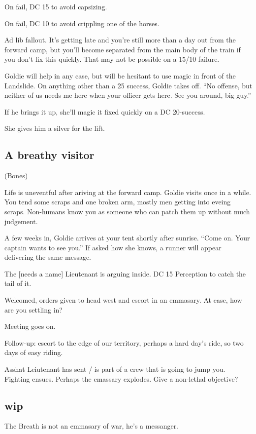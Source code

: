 \begin{multicols}{2}
On fail, DC 15 to avoid capsizing.

On fail, DC 10 to avoid crippling one of the horses.

Ad lib fallout.
It's getting late and you're still more than a day out from the forward camp, but you'll become
  separated from the main body of the train if you don't fix this quickly.
That may not be possible on a 15/10 failure.

Goldie will help in any case, but will be hesitant to use magic in front of the Landslide.
On anything other than a 25 success, Goldie takes off.
``No offense, but neither of us needs me here when your officer gets here.
See you around, big guy.''

If he brings it up, she'll magic it fixed quickly on a DC 20-success.

She gives him a silver for the lift.

\subsection{A breathy visitor}
(Bones)

Life is uneventful after ariving at the forward camp.
Goldie visits once in a while.
You tend some scraps and one broken arm, mostly men getting into eveing scraps.
Non-humans know you as someone who can patch them up without much judgement.

A few weeks in, Goldie arrives at your tent shortly after sunrise.
``Come on.
  Your captain wants to see you.''
If asked how she knows, a runner will appear delivering the same message.

The [needs a name] Lieutenant is arguing inside.
DC 15 Perception to catch the tail of it.

Welcomed, orders given to head west and escort in an emmasary.
At ease, how are you settling in?

Meeting goes on.

Follow-up: escort to the edge of our territory, perhaps a hard day's ride, so two days of easy
  riding.

Asshat Leiutenant has sent / is part of a crew that is going to jump you.
Fighting ensues.
Perhaps the emassary explodes.
Give a non-lethal objective?
\subsection{wip}

The Breath is not an emmasary of war, he's a messanger.


\end{multicols}

